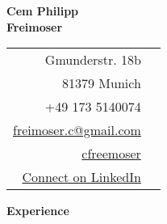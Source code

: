 \documentclass[letterpaper,12pt]{article}
\makeatletter
\def \firstname {Cem Philipp}
\def \lastname {Freimoser}
\def \linkedinicon {\faLinkedin}
\def \linkedintext {/dwight-schrute}
\def \homeicon {\faHome}
\def \phoneicon {\faPhone}
\def \phonetext {+49 173 5140074}
\def \emailicon {\faEnvelope}
\def \emaillink {mailto:freimoser.c@gmail.com}
\def \emailtext {freimoser.c@gmail.com}
\def \githubicon {\faGithub}
\def \githublink {https://github.com/cfreemoser}
\def \githubtext {cfreemoser}
\def \linkedinicon {\faLinkedin}
\def \linkedlink {https://www.linkedin.com/in/cem-philipp-freimoser-3b885011b/}
\def \linkedintext {Connect on LinkedIn}
\def \phone {\phonetext \hspace{3pt}\phoneicon}
\def \email {\href{\emaillink}{\emailtext}\hspace{3pt}\emailicon}
\def \github {\href{\githublink}{\githubtext}\hspace{3pt}\githubicon}
\def \home {Gmunderstr. 18b\hspace{3pt}\homeicon\\81379 Munich\makebox[1.5em]{}}
\def \linkedin {\href{\linkedlink}{\linkedintext}\hspace{3pt}\linkedinicon}
\renewcommand{\section}[2]{\vspace{5pt}
  \colorbox{teriary}{\color{white}\raggedbottom\normalsize\textbf{{#1}{\hspace{7pt}#2}}}
}
\makeatother
\begin{document}

\vspace{1cm} 
\begin{multicols}{2}
  \vspace{2cm}
  \textbf{\fontsize{28}{36}\selectfont \firstname}\\
  \textbf{\fontsize{28}{36}\selectfont  \lastname}
  
  \columnbreak
  
  \vspace{2cm}
  \begin{flushright}
      \begin{tabular}{rl}
          \home \\
          \phone \\
          \email \\
          \github \\
          \linkedin \\
       \end{tabular}
  \end{flushright}
\end{multicols}
\vspace{1cm}

\section{\faBusinessTime}{Experience}
\end{document}

